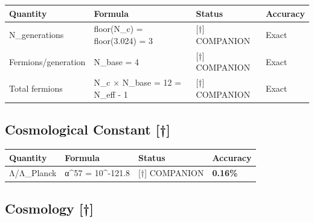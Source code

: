 \documentclass[
  11pt,
  letterpaper,
  twoside,
  openany]{book}
\makeatletter
\let\orig@subsection\subsection
\renewcommand{\subsection}{\needspace{6\baselineskip}\orig@subsection}
\makeatother
\begin{document}
\begin{longtable}[]{@{}
  >{\raggedright\arraybackslash}p{}
  >{\raggedright\arraybackslash}p{}
  >{\raggedright\arraybackslash}p{}
  >{\raggedright\arraybackslash}p{}@{}}
\toprule\noalign{}
\begin{minipage}[b]{\linewidth}\raggedright
Quantity
\end{minipage} & \begin{minipage}[b]{\linewidth}\raggedright
Formula
\end{minipage} & \begin{minipage}[b]{\linewidth}\raggedright
Status
\end{minipage} & \begin{minipage}[b]{\linewidth}\raggedright
Accuracy
\end{minipage} \\
\midrule\noalign{}
\endhead
\bottomrule\noalign{}
\endlastfoot
N\_generations & floor(N\_c) = floor(3.024) = 3 & {[}†{]} COMPANION &
Exact \\
Fermions/generation & N\_base = 4 & {[}†{]} COMPANION & Exact \\
Total fermions & N\_c × N\_base = 12 = N\_eff - 1 & {[}†{]} COMPANION &
Exact \\
\end{longtable}

\subsection{Cosmological Constant
{[}†{]}}\label{cosmological-constant-1}

\begin{longtable}[]{@{}llll@{}}
\toprule\noalign{}
Quantity & Formula & Status & Accuracy \\
\midrule\noalign{}
\endhead
\bottomrule\noalign{}
\endlastfoot
Λ/Λ\_Planck & α\^{}57 = 10\^{}-121.8 & {[}†{]} COMPANION &
\textbf{0.16\%} \\
\end{longtable}

\subsection{Cosmology {[}†{]}}\label{cosmology-1}
\end{document}
